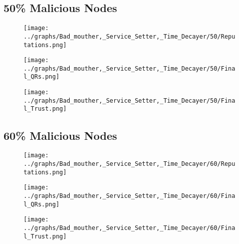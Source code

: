 \documentclass{article}
\begin{document}
  \begin{minipage}[t]{0.49\columnwidth}
    \subsection*{50\% Malicious Nodes}
        \begin{figure}[H]
            \centering
            \texttt{[image: ../graphs/Bad\_mouther,\_Service\_Setter,\_Time\_Decayer/50/Reputations.png]}
        \end{figure}
        \begin{figure}[H]
            \centering
            \texttt{[image: ../graphs/Bad\_mouther,\_Service\_Setter,\_Time\_Decayer/50/Final\_QRs.png]}
        \end{figure}
    \end{minipage}
    \begin{minipage}[t]{0.49\columnwidth}
        \begin{figure}[H]
            \centering
            \texttt{[image: ../graphs/Bad\_mouther,\_Service\_Setter,\_Time\_Decayer/50/Final\_Trust.png]}
        \end{figure}
    \end{minipage}

  \begin{minipage}[t]{0.49\columnwidth}
    \subsection*{60\% Malicious Nodes}
        \begin{figure}[H]
            \centering
            \texttt{[image: ../graphs/Bad\_mouther,\_Service\_Setter,\_Time\_Decayer/60/Reputations.png]}
        \end{figure}
        \begin{figure}[H]
            \centering
            \texttt{[image: ../graphs/Bad\_mouther,\_Service\_Setter,\_Time\_Decayer/60/Final\_QRs.png]}
        \end{figure}
    \end{minipage}
    \begin{minipage}[t]{0.49\columnwidth}
        \begin{figure}[H]
            \centering
            \texttt{[image: ../graphs/Bad\_mouther,\_Service\_Setter,\_Time\_Decayer/60/Final\_Trust.png]}
        \end{figure}
    \end{minipage}
\end{document}
